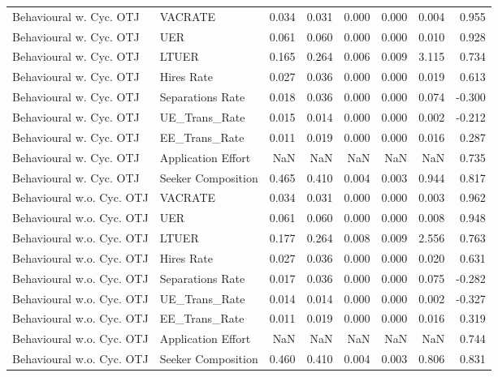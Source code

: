 \begin{table}[ht]
\begin{adjustbox}{width=\textwidth}
\begin{tabular}{llrrrrrr}
Behavioural w. Cyc. OTJ & VACRATE & 0.034 & 0.031 & 0.000 & 0.000 & 0.004 & 0.955 \\
Behavioural w. Cyc. OTJ & UER & 0.061 & 0.060 & 0.000 & 0.000 & 0.010 & 0.928 \\
Behavioural w. Cyc. OTJ & LTUER & 0.165 & 0.264 & 0.006 & 0.009 & 3.115 & 0.734 \\
Behavioural w. Cyc. OTJ & Hires Rate & 0.027 & 0.036 & 0.000 & 0.000 & 0.019 & 0.613 \\
Behavioural w. Cyc. OTJ & Separations Rate & 0.018 & 0.036 & 0.000 & 0.000 & 0.074 & -0.300 \\
Behavioural w. Cyc. OTJ & UE\_Trans\_Rate & 0.015 & 0.014 & 0.000 & 0.000 & 0.002 & -0.212 \\
Behavioural w. Cyc. OTJ & EE\_Trans\_Rate & 0.011 & 0.019 & 0.000 & 0.000 & 0.016 & 0.287 \\
Behavioural w. Cyc. OTJ & Application Effort & NaN & NaN & NaN & NaN & NaN & 0.735 \\
Behavioural w. Cyc. OTJ & Seeker Composition & 0.465 & 0.410 & 0.004 & 0.003 & 0.944 & 0.817 \\
Behavioural w.o. Cyc. OTJ & VACRATE & 0.034 & 0.031 & 0.000 & 0.000 & 0.003 & 0.962 \\
Behavioural w.o. Cyc. OTJ & UER & 0.061 & 0.060 & 0.000 & 0.000 & 0.008 & 0.948 \\
Behavioural w.o. Cyc. OTJ & LTUER & 0.177 & 0.264 & 0.008 & 0.009 & 2.556 & 0.763 \\
Behavioural w.o. Cyc. OTJ & Hires Rate & 0.027 & 0.036 & 0.000 & 0.000 & 0.020 & 0.631 \\
Behavioural w.o. Cyc. OTJ & Separations Rate & 0.017 & 0.036 & 0.000 & 0.000 & 0.075 & -0.282 \\
Behavioural w.o. Cyc. OTJ & UE\_Trans\_Rate & 0.014 & 0.014 & 0.000 & 0.000 & 0.002 & -0.327 \\
Behavioural w.o. Cyc. OTJ & EE\_Trans\_Rate & 0.011 & 0.019 & 0.000 & 0.000 & 0.016 & 0.319 \\
Behavioural w.o. Cyc. OTJ & Application Effort & NaN & NaN & NaN & NaN & NaN & 0.744 \\
Behavioural w.o. Cyc. OTJ & Seeker Composition & 0.460 & 0.410 & 0.004 & 0.003 & 0.806 & 0.831 \\
\bottomrule
\end{tabular}
\end{adjustbox}
\end{table}
